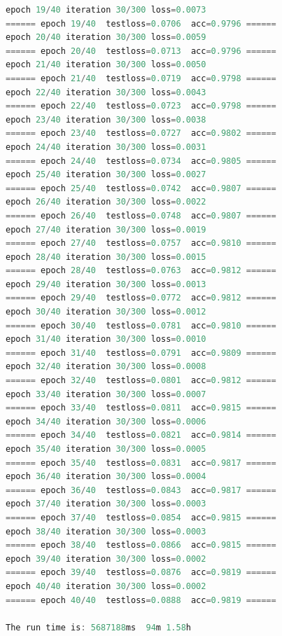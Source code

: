 \documentclass[UTF-8]{progbookcn}
\begin{document}
\begin{lstlisting}[language=C,caption={输出代码}]
epoch 19/40 iteration 30/300 loss=0.0073
====== epoch 19/40  testloss=0.0706  acc=0.9796 ======
epoch 20/40 iteration 30/300 loss=0.0059
====== epoch 20/40  testloss=0.0713  acc=0.9796 ======
epoch 21/40 iteration 30/300 loss=0.0050
====== epoch 21/40  testloss=0.0719  acc=0.9798 ======
epoch 22/40 iteration 30/300 loss=0.0043
====== epoch 22/40  testloss=0.0723  acc=0.9798 ======
epoch 23/40 iteration 30/300 loss=0.0038
====== epoch 23/40  testloss=0.0727  acc=0.9802 ======
epoch 24/40 iteration 30/300 loss=0.0031
====== epoch 24/40  testloss=0.0734  acc=0.9805 ======
epoch 25/40 iteration 30/300 loss=0.0027
====== epoch 25/40  testloss=0.0742  acc=0.9807 ======
epoch 26/40 iteration 30/300 loss=0.0022
====== epoch 26/40  testloss=0.0748  acc=0.9807 ======
epoch 27/40 iteration 30/300 loss=0.0019
====== epoch 27/40  testloss=0.0757  acc=0.9810 ======
epoch 28/40 iteration 30/300 loss=0.0015
====== epoch 28/40  testloss=0.0763  acc=0.9812 ======
epoch 29/40 iteration 30/300 loss=0.0013
====== epoch 29/40  testloss=0.0772  acc=0.9812 ======
epoch 30/40 iteration 30/300 loss=0.0012
====== epoch 30/40  testloss=0.0781  acc=0.9810 ======
epoch 31/40 iteration 30/300 loss=0.0010
====== epoch 31/40  testloss=0.0791  acc=0.9809 ======
epoch 32/40 iteration 30/300 loss=0.0008
====== epoch 32/40  testloss=0.0801  acc=0.9812 ======
epoch 33/40 iteration 30/300 loss=0.0007
====== epoch 33/40  testloss=0.0811  acc=0.9815 ======
epoch 34/40 iteration 30/300 loss=0.0006
====== epoch 34/40  testloss=0.0821  acc=0.9814 ======
epoch 35/40 iteration 30/300 loss=0.0005
====== epoch 35/40  testloss=0.0831  acc=0.9817 ======
epoch 36/40 iteration 30/300 loss=0.0004
====== epoch 36/40  testloss=0.0843  acc=0.9817 ======
epoch 37/40 iteration 30/300 loss=0.0003
====== epoch 37/40  testloss=0.0854  acc=0.9815 ======
epoch 38/40 iteration 30/300 loss=0.0003
====== epoch 38/40  testloss=0.0866  acc=0.9815 ======
epoch 39/40 iteration 30/300 loss=0.0002
====== epoch 39/40  testloss=0.0876  acc=0.9819 ======
epoch 40/40 iteration 30/300 loss=0.0002
====== epoch 40/40  testloss=0.0888  acc=0.9819 ======

The run time is: 5687188ms	94m	1.58h
\end{lstlisting}







\end{document}
